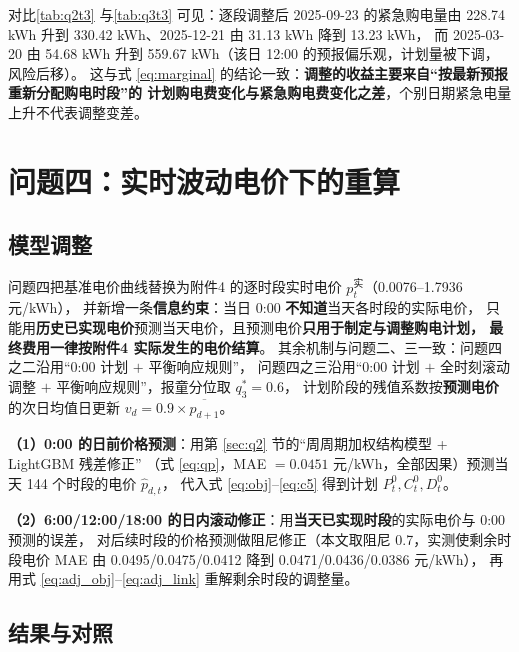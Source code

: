 \documentclass[12pt,a4paper,fontset=fandol]{ctexart}
\begin{document}
对比\cref{tab:q2t3} 与\cref{tab:q3t3} 可见\nobreak：逐段调整后 2025-09-23 的紧急购电量由
228.74 kWh 升到 330.42 kWh\nobreak、2025-12-21 由 31.13 kWh 降到 13.23 kWh\nobreak，
而 2025-03-20 由 54.68 kWh 升到 559.67 kWh（该日 12:00 的预报偏乐观\nobreak，计划量被下调\nobreak，风险后移\nobreak）\nobreak。
这与式 \eqref{eq:marginal} 的结论一致\nobreak：\textbf{调整的收益主要来自“按最新预报重新分配购电时段\nobreak”的
计划购电费变化与紧急购电费变化之差}\nobreak，个别日期紧急电量上升不代表调整变差\nobreak。


\section{问题四\nobreak：实时波动电价下的重算}
\label{sec:q4}

\subsection{模型调整}

问题四把基准电价曲线替换为附件4 的逐时段实时电价 $p_t^{\text{实}}$（0.0076--1.7936 元/kWh\nobreak）\nobreak，
并新增一条\textbf{信息约束}\nobreak：当日 0:00 \textbf{不知道}当天各时段的实际电价\nobreak，
只能用\textbf{历史已实现电价}预测当天电价\nobreak，且预测电价\textbf{只用于制定与调整购电计划\nobreak，
最终费用一律按附件4 实际发生的电价结算}\nobreak。
其余机制与问题二、三一致\nobreak：问题四之二沿用“0:00 计划 $+$ 平衡响应规则\nobreak”\nobreak，
问题四之三沿用“0:00 计划 $+$ 全时刻滚动调整 $+$ 平衡响应规则\nobreak”\nobreak，报童分位取 $q_3^*=0.6$\nobreak，
计划阶段的残值系数按\textbf{预测电价}的次日均值日更新 $v_d=0.9\times\overline{\hat p_{d+1}}$\nobreak。

\textbf{（1\nobreak）0:00 的日前价格预测}\nobreak：用第 \ref{sec:q2} 节的“周周期加权结构模型 + LightGBM 残差修正\nobreak”
（式 \eqref{eq:qp}\nobreak，MAE $=0.0451$ 元/kWh\nobreak，全部因果\nobreak）预测当天 144 个时段的电价 $\hat p_{d,t}$\nobreak，
代入式 \eqref{eq:obj}--\eqref{eq:c5} 得到计划 $P^0_t,C^0_t,D^0_t$\nobreak。

\textbf{（2\nobreak）6:00/12:00/18:00 的日内滚动修正}\nobreak：用\textbf{当天已实现时段}的实际电价与 0:00 预测的误差\nobreak，
对后续时段的价格预测做阻尼修正（本文取阻尼 0.7\nobreak，实测使剩余时段电价 MAE 由
0.0495/0.0475/0.0412 降到 0.0471/0.0436/0.0386 元/kWh\nobreak）\nobreak，
再用式 \eqref{eq:adj_obj}--\eqref{eq:adj_link} 重解剩余时段的调整量\nobreak。

\subsection{结果与对照}
\end{document}
